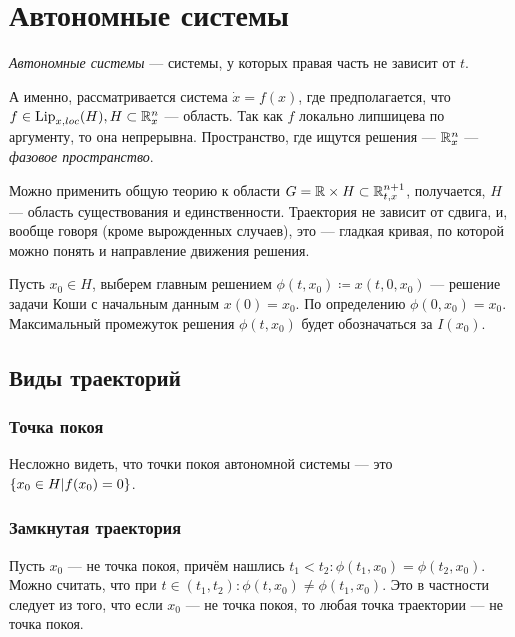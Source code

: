 \documentclass[a4paper]{report}
\begin{document}
    \chapter{Автономные системы}
    \emph{Автономные системы} --- системы, у которых правая часть не зависит от $t$.

    А именно, рассматривается система $\dot{x} = f(x)$, где предполагается, что $f \in \operatorname{Lip}_{x,loc}(H), H \subset \mathbb{R}_x^n$ --- область.
    Так как $f$ локально липшицева по аргументу, то она непрерывна.
    Пространство, где ищутся решения --- $\mathbb{R}^n_x$ --- \emph{фазовое пространство}.

    Можно применить общую теорию к области $G = \mathbb{R} \times H \subset \mathbb{R}_{t,x}^{n + 1}$, получается, $H$ --- область существования и единственности.
    Траектория не зависит от сдвига, и, вообще говоря (кроме вырожденных случаев), это --- гладкая кривая, по которой можно понять и направление движения решения.

    Пусть $x_0 \in H$, выберем главным решением $\phi(t, x_0) \coloneqq x(t, 0, x_0)$ --- решение задачи Коши с начальным данным $x(0) = x_0$.
    По определению $\phi(0, x_0) = x_0$.
    Максимальный промежуток решения $\phi(t, x_0)$ будет обозначаться за $I(x_0)$.


    \section{Виды траекторий}

    \subsection{Точка покоя}
    Несложно видеть, что точки покоя автономной системы --- это $\left\{x_0 \in H\middle|f(x_0) = 0\right\}$.

    \subsection{Замкнутая траектория}
    Пусть $x_0$ --- не точка покоя, причём нашлись $t_1 < t_2: \phi(t_1, x_0) = \phi(t_2, x_0)$.
    Можно считать, что при $t \in (t_1, t_2): \phi(t, x_0) \ne \phi(t_1, x_0)$.
    Это в частности следует из того, что если $x_0$ --- не точка покоя, то любая точка траектории --- не точка покоя.
\end{document}
